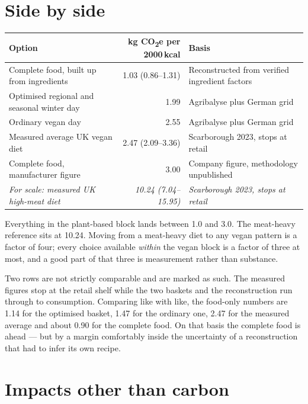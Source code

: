 \documentclass[11pt,a4paper]{article}
\newcommand{\co}{CO\textsubscript{2}e}
\begin{document}
\section{Side by side}

\begin{table}[h]
\centering
\footnotesize
\begin{tabularx}{\textwidth}{@{}LrL@{}}
\toprule
\textbf{Option} & \textbf{kg \co{} per 2000\,kcal} & \textbf{Basis} \\
\midrule
Complete food, built up from ingredients & 1.03 \; (0.86--1.31) & Reconstructed from verified ingredient factors \\
Optimised regional and seasonal winter day & 1.99 & Agribalyse plus German grid \\
Ordinary vegan day & 2.55 & Agribalyse plus German grid \\
Measured average UK vegan diet & 2.47 \; (2.09--3.36) & Scarborough 2023, stops at retail \\
Complete food, manufacturer figure & 3.00 & Company figure, methodology unpublished \\
\addlinespace
\emph{For scale: measured UK high-meat diet} & \emph{10.24 \; (7.04--15.95)} & \emph{Scarborough 2023, stops at retail} \\
\bottomrule
\end{tabularx}
\end{table}

Everything in the plant-based block lands between 1.0 and 3.0. The meat-heavy
reference sits at 10.24. Moving from a meat-heavy diet to any vegan pattern is a
factor of four; every choice available \emph{within} the vegan block is a factor of
three at most, and a good part of that three is measurement rather than substance.

Two rows are not strictly comparable and are marked as such. The measured figures stop
at the retail shelf while the two baskets and the reconstruction run through to
consumption. Comparing like with like, the food-only numbers are 1.14 for the
optimised basket, 1.47 for the ordinary one, 2.47 for the measured average and about
0.90 for the complete food. On that basis the complete food is ahead — but by a margin
comfortably inside the uncertainty of a reconstruction that had to infer its own
recipe.

\section{Impacts other than carbon}
\end{document}

